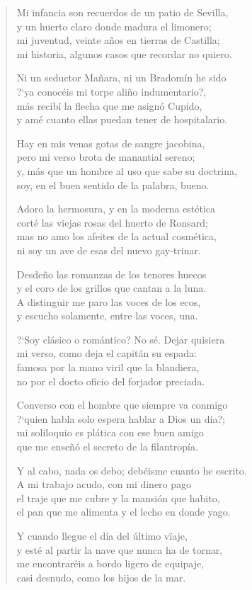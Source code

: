 \documentclass[10pt,a5paper,oneside]{book}
\begin{document}
\begin{verse}
Mi infancia son recuerdos de un patio de Sevilla,\\
y un huerto claro donde madura el limonero;\\
mi juventud, veinte años en tierras de Castilla;\\
mi historia, algunos casos que recordar no quiero.

Ni un seductor Mañara, ni un Bradomín he sido\\
?`ya conocéis mi torpe aliño indumentario?,\\
más recibí la flecha que me asignó Cupido,\\
y amé cuanto ellas puedan tener de hospitalario.

Hay en mis venas gotas de sangre jacobina,\\
pero mi verso brota de manantial sereno;\\
y, más que un hombre al uso que sabe su doctrina,\\
soy, en el buen sentido de la palabra, bueno.

Adoro la hermosura, y en la moderna estética\\
corté las viejas rosas del huerto de Ronsard;\\
mas no amo los afeites de la actual cosmética,\\
ni soy un ave de esas del nuevo gay-trinar.

Desdeño las romanzas de los tenores huecos\\
y el coro de los grillos que cantan a la luna.\\
A distinguir me paro las voces de los ecos,\\
y escucho solamente, entre las voces, una.

?`Soy clásico o romántico? No sé. Dejar quisiera\\
mi verso, como deja el capitán su espada:\\
famosa por la mano viril que la blandiera,\\
no por el docto oficio del forjador preciada.

Converso con el hombre que siempre va conmigo\\
?`quien habla solo espera hablar a Dios un día?;\\
mi soliloquio es plática con ese buen amigo\\
que me enseñó el secreto de la filantropía.

Y al cabo, nada os debo; debéisme cuanto he escrito.\\
A mi trabajo acudo, con mi dinero pago\\
el traje que me cubre y la mansión que habito,\\
el pan que me alimenta y el lecho en donde yago.

Y cuando llegue el día del último vïaje,\\
y esté al partir la nave que nunca ha de tornar,\\
me encontraréis a bordo ligero de equipaje,\\
casi desnudo, como los hijos de la mar.
\end{verse}
\end{document}
